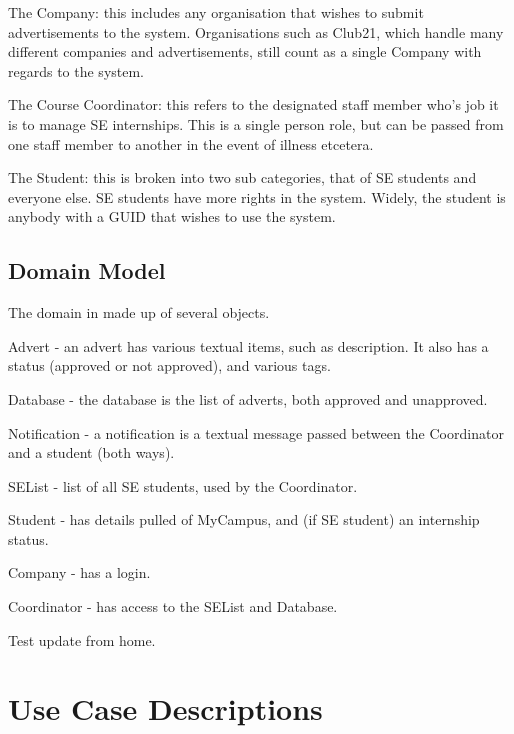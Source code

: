 \documentclass{l3deliverable}
\begin{document}
The Company: this includes any organisation that wishes to submit 
advertisements to the system. Organisations such as Club21, which handle
many different companies and advertisements, still count as a single Company
with regards to the system.

The Course Coordinator: this refers to the designated staff member who's job
it is to manage SE internships. This is a single person role, but can be 
passed from one staff member to another in the event of illness etcetera.

The Student: this is broken into two sub categories, that of SE students and
everyone else. SE students have more rights in the system. Widely, the student
is anybody with a GUID that wishes to use the system.


\subsection{Domain Model}


The domain in made up of several objects.

Advert - an advert has various textual items, such as description. It also
has a status (approved or not approved), and various tags.

Database - the database is the list of adverts, both approved and unapproved.

Notification - a notification is a textual message passed between the 
Coordinator and a student (both ways).

SEList - list of all SE students, used by the Coordinator. 

Student - has details pulled of MyCampus, and (if SE student) an internship 
status.

Company - has a login.

Coordinator - has access to the SEList and Database.

Test update from home.


\section{Use Case Descriptions}

\end{document}
